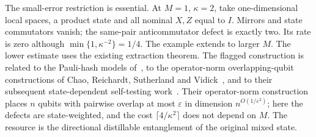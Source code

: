 The small-error restriction is essential. At $M=1$, $\kappa=2$, take one-dimensional local spaces, a product state and all nominal $X,Z$ equal to $I$. Mirrors and state commutators vanish; the same-pair anticommutator defect is exactly two. Its rate is zero although $\min\{1,\kappa^{-2}\}=1/4$. The example extends to larger $M$. The lower estimate uses the existing extraction theorem. The flagged construction is related to the Pauli-hash models of~\cite[Proposition~9.4]{DM-game}, to the operator-norm overlapping-qubit constructions of Chao, Reichardt, Sutherland and Vidick~\cite{CRSV17}, and to their subsequent state-dependent self-testing work~\cite{CRSV18}. Their operator-norm construction places $n$ qubits with pairwise overlap at most $\varepsilon$ in dimension $n^{O(1/\varepsilon^2)}$; here the defects are state-weighted, and the cost $\lceil4/\kappa^2\rceil$ does not depend on $M$. The resource is the directional distillable entanglement of the original mixed state.
